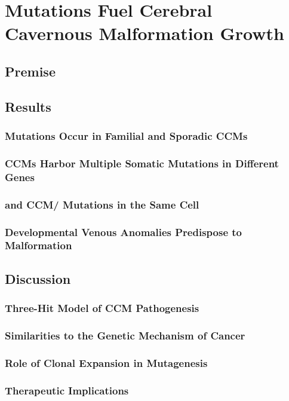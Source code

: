 \chapter{ Mutations Fuel Cerebral Cavernous Malformation Growth}

\section{Premise}

\section{Results}
\subsection{ Mutations Occur in Familial and Sporadic CCMs}
\subsection{CCMs Harbor Multiple Somatic Mutations in Different Genes}
\subsection{ and CCM/ Mutations in the Same Cell}
\subsection{Developmental Venous Anomalies Predispose to Malformation}

\section{Discussion}
\subsection{Three-Hit Model of CCM Pathogenesis}
\subsection{Similarities to the Genetic Mechanism of Cancer}
\subsection{Role of Clonal Expansion in Mutagenesis}
\subsection{Therapeutic Implications}
